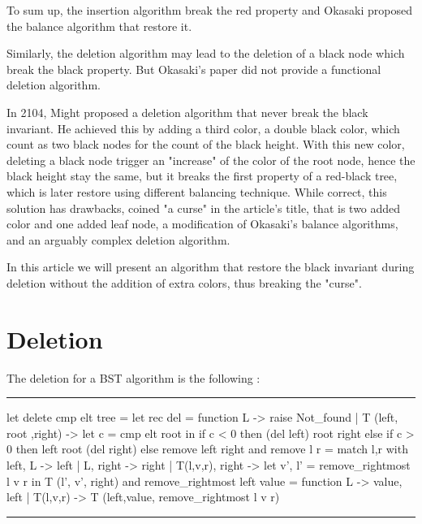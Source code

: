 \documentclass[10pt,a4paper]{article}
\newenvironment{codeblock}%
{\center \minipage{\textwidth} \vspace{6pt} \hrule \vspace{6pt} \minted{ocaml}}%
{\endminted \hrule \vspace{6pt} \endminipage \endcenter}
\begin{document}
To sum up, the insertion algorithm break the red property and Okasaki proposed the balance algorithm that restore it.

Similarly, the deletion algorithm may lead to the deletion of a black node which break the black property. But Okasaki's paper did not provide a functional deletion algorithm.

In 2104, Might proposed a deletion algorithm that never break the black invariant. He achieved this by adding a third color, a double black color, which count as two black nodes for the count of the black height.
With this new color, deleting a black node trigger an "increase" of the color of the root node, hence the black height stay the same, but it breaks the first property of a red-black tree, which is later restore using different balancing technique.
While correct, this solution has drawbacks, coined "a curse" in the article's title, that is two added color and one added leaf node, a modification of Okasaki's balance algorithms, and an arguably complex deletion algorithm.

In this article we will present an algorithm that restore the black invariant during deletion without the addition of extra colors, thus breaking the "curse".

\section{Deletion}

The deletion for a BST algorithm is the following :
\begin{codeblock}
let delete cmp elt tree =
    let rec del = function
        L -> raise Not_found
      | T (left, root ,right) ->
        let c = cmp elt root in
        if c < 0 then (del left) root right
        else if c > 0 then left root (del right)
        else remove left right
    and remove l r = match l,r with
        left, L  -> left
      | L, right -> right
      | T(l,v,r), right ->
        let v', l' = remove_rightmost l v r in
        T (l', v', right)
    and remove_rightmost left value = function
        L -> value, left
      | T(l,v,r) -> T (left,value, remove_rightmost l v r)
\end{codeblock}
\end{document}
